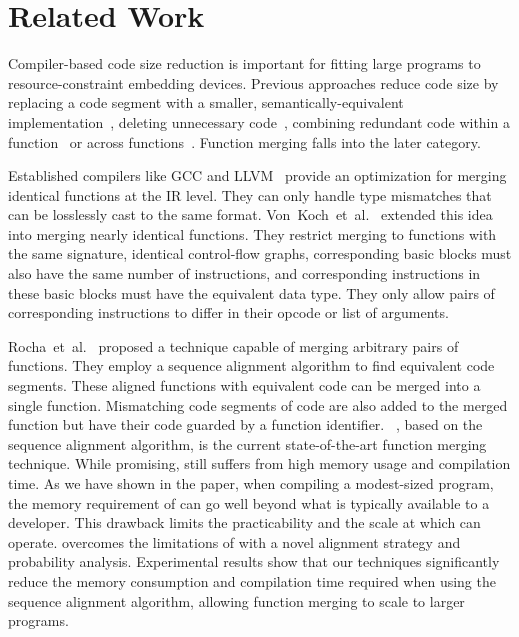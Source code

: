 
\section{Related Work}
Compiler-based code size reduction is important for fitting large programs to resource-constraint embedding devices. Previous approaches reduce code size by replacing a code segment with a smaller, semantically-equivalent implementation~\cite{massalin87,tanenbaum82}, deleting unnecessary code~\cite{cooper99,knoop94}, combining redundant code within a function~\cite{cocke70,chen03} or across functions~\cite{loki04,chabbi21}. Function merging falls into the later category. 

Established compilers like GCC and LLVM~\cite{llvm-fm,livska14} provide an optimization for merging identical functions at the IR level. They can only handle type mismatches that can be losslessly cast to the same format. Von~Koch~et~al.~\cite{edler14} extended this idea into merging nearly identical functions.
They restrict merging to functions with the same signature, identical control-flow graphs, corresponding basic blocks must also have the same number of instructions, and  corresponding instructions in these basic blocks must have the equivalent data type.
They only allow pairs of corresponding instructions to differ in their opcode or list of arguments.

Rocha~et~al.~\cite{rocha19} proposed a technique capable of merging arbitrary pairs of functions. They employ a sequence alignment algorithm to find equivalent code segments. These aligned functions with equivalent code can be merged into a single function. Mismatching code segments of code are also added to the merged function but have their code guarded by a function identifier. \SOAName~\cite{rocha20}, based on the sequence alignment algorithm, is the current state-of-the-art function merging technique. While promising, \SOAName still suffers from high memory usage and compilation time. As we have shown in the paper, when compiling a modest-sized program, the memory requirement of \SOAName can go well beyond what is typically available to a developer. This drawback limits the practicability and the scale at which \SOAName can operate. 
\ProjName overcomes the limitations of \SOAName with a novel alignment strategy and probability analysis. Experimental results show that our techniques significantly reduce the memory consumption and compilation time required when using the sequence alignment algorithm, allowing function merging to scale to larger programs. 


